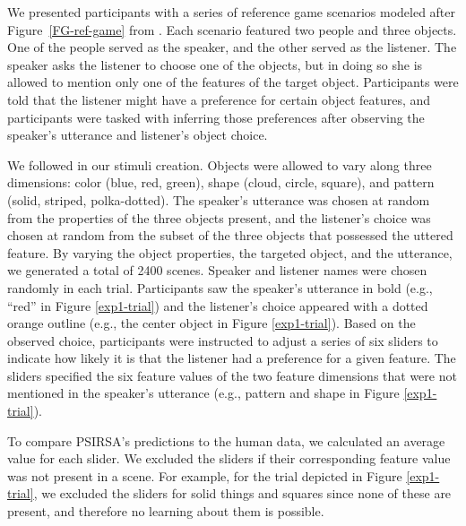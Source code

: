 \documentclass[11pt,a4paper]{article}
\begin{document}
We presented participants with a series of reference game scenarios modeled after Figure~\ref{FG-ref-game} from .
Each scenario featured two people and three objects.
One of the people served as the speaker, and the other served as the listener. The speaker asks the listener to choose one of the objects, but in doing so she is allowed to mention only one of the features of the target object. Participants were told that the listener might have a preference for certain object features, and participants were tasked with inferring those preferences after observing the speaker's utterance and listener's object choice.

We followed  in our stimuli creation. Objects were allowed to vary along three dimensions: color (blue, red, green), shape (cloud, circle, square), and pattern (solid, striped, polka-dotted). The speaker's utterance was chosen at random from the properties of the three objects present, and the listener's choice was chosen at random from the subset of the three objects that possessed the uttered feature. By varying the object properties, the targeted object, and the utterance, we generated a total of 2400 scenes. Speaker and listener names were chosen randomly in each trial. Participants saw the speaker's utterance in bold (e.g., ``red'' in Figure \ref{exp1-trial}) and the listener's choice appeared with a dotted orange outline (e.g., the center object in Figure \ref{exp1-trial}). Based on the observed choice, participants were instructed to adjust a series of six sliders to indicate how likely it is that the listener had a preference for a given feature. The sliders specified the six feature values of the two feature dimensions that were not mentioned in the speaker's utterance (e.g., pattern and shape in Figure \ref{exp1-trial}). 

To compare PSIRSA's predictions to the human data, we calculated an average value for each slider.
We excluded the sliders if their corresponding feature value was not present in a scene. For example, for the trial depicted in Figure \ref{exp1-trial}, we excluded the sliders for solid things and squares since none of these are present, and therefore no learning about them is possible.
\end{document}
